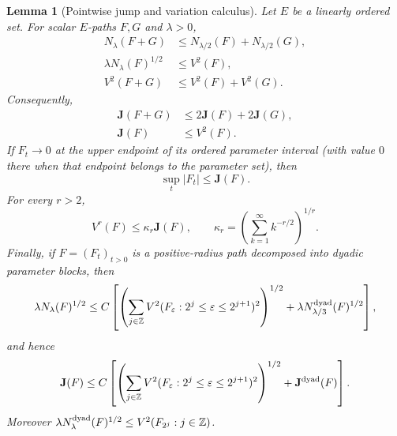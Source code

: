 \documentclass[11pt]{article}
\numberwithin{equation}{section}
\newtheorem{lemma}[theorem]{Lemma}
\theoremstyle{remark}
\theoremstyle{definition}
\begin{document}
\begin{lemma}[Pointwise jump and variation calculus]\label{lem:jumpcalc}
Let $E$ be a linearly ordered set.  For scalar $E$-paths $F,G$ and
$\lambda>0$,
\begin{align}
 N_\lambda(F+G)&\le N_{\lambda/2}(F)+N_{\lambda/2}(G),
 \label{eq:jumpadd}\\
 \lambda N_\lambda(F)^{1/2}&\le V^2(F),
 \label{eq:jumpvar}\\
 V^2(F+G)&\le V^2(F)+V^2(G).
 \label{eq:varadd}
\end{align}
Consequently,
\begin{align}
 \mathbf J(F+G)&\le2\mathbf J(F)+2\mathbf J(G),
 \label{eq:pointwise-jump-quasitriangle}\\
 \mathbf J(F)&\le V^2(F).
 \label{eq:pointwise-jump-by-V2}
\end{align}
If $F_t\to0$ at the upper endpoint of its ordered parameter interval
(with value $0$ there when that endpoint belongs to the parameter set), then
\begin{equation}\label{eq:anchor-controls-maximal}
 \sup_t|F_t|\le\mathbf J(F).
\end{equation}
For every $r>2$,
\begin{equation}\label{eq:pointwise-jump-to-variation}
 V^r(F)\le\kappa_r\mathbf J(F),
 \qquad
 \kappa_r=\left(\sum_{k=1}^\infty k^{-r/2}\right)^{1/r}.
\end{equation}
Finally, if $F=(F_t)_{t>0}$ is a positive-radius path decomposed into
dyadic parameter blocks, then
\begin{equation}\label{eq:longshort}
 \lambda N_\lambda(F)^{1/2}
 \le C\left[\left(\sum_{j\in\mathbb Z}
 V^2(F_\varepsilon:2^j\le\varepsilon\le2^{j+1})^2\right)^{1/2}
 +\lambda N^{\rm dyad}_{\lambda/3}(F)^{1/2}\right],
\end{equation}
and hence
\begin{equation}\label{eq:pointwise-longshort}
 \mathbf J(F)
 \le C\left[\left(\sum_{j\in\mathbb Z}
 V^2(F_\varepsilon:2^j\le\varepsilon\le2^{j+1})^2\right)^{1/2}
 +\mathbf J^{\rm dyad}(F)\right].
\end{equation}
Moreover $\lambda N^{\rm dyad}_\lambda(F)^{1/2}\le
V^2(F_{2^j}:j\in\mathbb Z)$.
\end{lemma}
\end{document}
